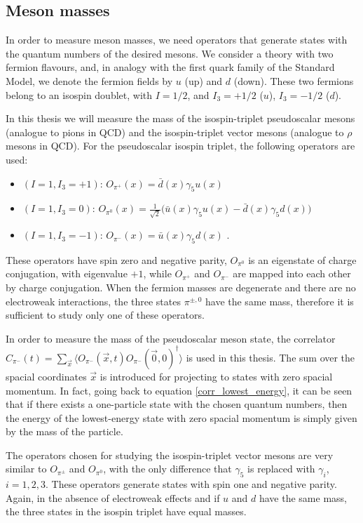 \subsection{Meson masses}

In order to measure meson masses, we need operators that generate states with the quantum numbers of the desired mesons. We consider a theory with two fermion flavours, and, in analogy with the first quark family of the Standard Model, we denote the fermion fields by $u$ (up) and $d$ (down). These two fermions belong to an isospin doublet, with $I = 1/2$, and $I_3 = +1/2$ ($u$), $I_3 = -1/2$ ($d$).

In this thesis we will measure the mass of the isospin-triplet pseudoscalar mesons (analogue to pions in QCD) and the isospin-triplet vector mesons (analogue to $\rho$ mesons in QCD). For the pseudoscalar isospin triplet, the following operators are used:

\begin{itemize}
\item $(I=1, I_3 = +1)$: $O_{\pi^+}(x) = \bar{d}(x) \gamma_5 u(x)$
\item $(I=1, I_3 = 0)$: $O_{\pi^0}(x) = \frac{1}{\sqrt 2} \bigl( \bar{u}(x) \gamma_5 u(x) - \bar{d}(x) \gamma_5 d(x) \bigr)$
\item $(I=1, I_3 = -1)$: $O_{\pi^-}(x) = \bar{u}(x) \gamma_5 d(x)$ \: .
\end{itemize}
%
These operators have spin zero and negative parity, $O_{\pi^0}$ is an eigenstate of charge conjugation, with eigenvalue $+1$, while $O_{\pi^+}$ and $O_{\pi^-}$ are mapped into each other by charge conjugation. When the fermion masses are degenerate and there are no electroweak interactions, the three states $\pi^{\pm,0}$ have the same mass, therefore it is sufficient to study only one of these operators.

In order to measure the mass of the pseudoscalar meson state, the correlator $C_{\pi^-}(t) = \sum_{\vec x} \langle O_{\pi^-}(\vec x,t)  O_{\pi^-} (\vec 0,0)^{\dagger} \rangle$ is used in this thesis. The sum over the spacial coordinates $\vec x$ is introduced for projecting to states with zero spacial momentum. In fact, going back to equation \ref{corr_lowest_energy}, it can be seen that if there exists a one-particle state with the chosen quantum numbers, then the energy of the lowest-energy state with zero spacial momentum is simply given by the mass of the particle.

The operators chosen for studying the isospin-triplet vector mesons are very similar to $O_{\pi^{\pm}}$ and $O_{\pi^0}$, with the only difference that $\gamma_5$ is replaced with $\gamma_i$, $i = 1, 2, 3$. These operators generate states with spin one and negative parity. Again, in the absence of electroweak effects and if $u$ and $d$ have the same mass, the three states in the isospin triplet have equal masses.

